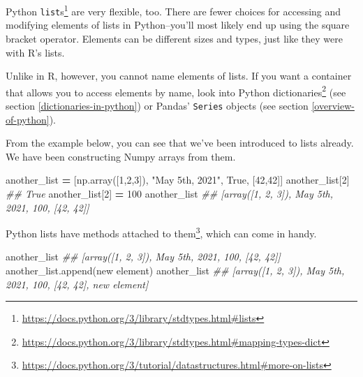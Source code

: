 \documentclass[
  12pt,
]{krantz}
\makeatletter
\newenvironment{Shaded}{\begin{snugshade}}{\end{snugshade}}
\newcommand{\CommentTok}[1]{\textcolor[rgb]{0.37,0.37,0.37}{\textit{#1}}}
\newcommand{\DecValTok}[1]{\textcolor[rgb]{0.06,0.06,0.06}{#1}}
\newcommand{\NormalTok}[1]{#1}
\newcommand{\OperatorTok}[1]{\textcolor[rgb]{0.43,0.43,0.43}{\textbf{#1}}}
\newcommand{\StringTok}[1]{\textcolor[rgb]{0.5,0.5,0.5}{#1}}
\newcommand{\VariableTok}[1]{\textcolor[rgb]{0,0,0}{#1}}
\renewcommand{\href}[2]{#2\footnote{\url{#1}}}
\newenvironment{kframe}{%
\medskip{}
\setlength{\fboxsep}{.8em}
 \def\at@end@of@kframe{}%
 \ifinner\ifhmode%
  \def\at@end@of@kframe{\end{minipage}}%
  \begin{minipage}{\columnwidth}%
 \fi\fi%
 \def\FrameCommand##1{\hskip\@totalleftmargin \hskip-\fboxsep
 \colorbox{shadecolor}{##1}\hskip-\fboxsep
     \hskip-\linewidth \hskip-\@totalleftmargin \hskip\columnwidth}%
 \MakeFramed {\advance\hsize-\width
   \@totalleftmargin\z@ \linewidth\hsize
   \@setminipage}}%
 {\par\unskip\endMakeFramed%
 \at@end@of@kframe}
\renewenvironment{Shaded}{\begin{kframe}}{\end{kframe}}
\makeatother
\begin{document}
\href{https://docs.python.org/3/library/stdtypes.html\#lists}{Python \texttt{list}s} are very flexible, too. There are fewer choices for accessing and modifying elements of lists in Python--you'll most likely end up using the square bracket operator. Elements can be different sizes and types, just like they were with R's lists.

Unlike in R, however, you cannot name elements of lists. If you want a container that allows you to access elements by name, look into Python \href{https://docs.python.org/3/library/stdtypes.html\#mapping-types-dict}{dictionaries} (see section \ref{dictionaries-in-python}) or Pandas' \texttt{Series} objects (see section \ref{overview-of-python}).

From the example below, you can see that we've been introduced to lists already. We have been constructing Numpy arrays from them.

\begin{Shaded}
\begin{Highlighting}[]
\NormalTok{another\_list }\OperatorTok{=}\NormalTok{ [np.array([}\DecValTok{1}\NormalTok{,}\DecValTok{2}\NormalTok{,}\DecValTok{3}\NormalTok{]), }\StringTok{"May 5th, 2021"}\NormalTok{, }\VariableTok{True}\NormalTok{, [}\DecValTok{42}\NormalTok{,}\DecValTok{42}\NormalTok{]]}
\NormalTok{another\_list[}\DecValTok{2}\NormalTok{]}
\CommentTok{\#\# True}
\NormalTok{another\_list[}\DecValTok{2}\NormalTok{] }\OperatorTok{=} \DecValTok{100}
\NormalTok{another\_list}
\CommentTok{\#\# [array([1, 2, 3]), \textquotesingle{}May 5th, 2021\textquotesingle{}, 100, [42, 42]]}
\end{Highlighting}
\end{Shaded}

Python lists have \href{https://docs.python.org/3/tutorial/datastructures.html\#more-on-lists}{methods attached to them}, which can come in handy.

\begin{Shaded}
\begin{Highlighting}[]
\NormalTok{another\_list}
\CommentTok{\#\# [array([1, 2, 3]), \textquotesingle{}May 5th, 2021\textquotesingle{}, 100, [42, 42]]}
\NormalTok{another\_list.append(}\StringTok{\textquotesingle{}new element\textquotesingle{}}\NormalTok{)}
\NormalTok{another\_list}
\CommentTok{\#\# [array([1, 2, 3]), \textquotesingle{}May 5th, 2021\textquotesingle{}, 100, [42, 42], \textquotesingle{}new element\textquotesingle{}]}
\end{Highlighting}
\end{Shaded}
\end{document}
